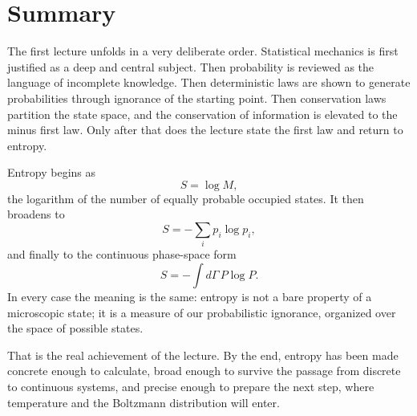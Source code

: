 \section{Summary}

The first lecture unfolds in a very deliberate order. Statistical mechanics is first justified as a deep and central subject. Then probability is reviewed as the language of incomplete knowledge. Then deterministic laws are shown to generate probabilities through ignorance of the starting point. Then conservation laws partition the state space, and the conservation of information is elevated to the minus first law. Only after that does the lecture state the first law and return to entropy.

Entropy begins as
\begin{equation}
S=\log M,
\end{equation}
the logarithm of the number of equally probable occupied states. It then broadens to
\begin{equation}
S=-\sum_i p_i\log p_i,
\end{equation}
and finally to the continuous phase-space form
\begin{equation}
S=-\int d\Gamma\,P\log P.
\end{equation}
In every case the meaning is the same: entropy is not a bare property of a microscopic state; it is a measure of our probabilistic ignorance, organized over the space of possible states.

That is the real achievement of the lecture. By the end, entropy has been made concrete enough to calculate, broad enough to survive the passage from discrete to continuous systems, and precise enough to prepare the next step, where temperature and the Boltzmann distribution will enter.